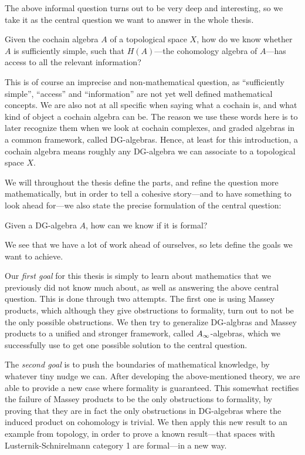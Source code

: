 The above informal question turns out to be very deep and interesting, so we take it as the central question we want to answer in the whole thesis. 

\begin{central}
Given the cochain algebra $A$ of a topological space $X$, how do we know whether $A$ is sufficiently simple, such that $H(A)$---the cohomology algebra of $A$---has access to all the relevant information?
\end{central}

This is of course an imprecise and non-mathematical question, as ``sufficiently simple'', ``access'' and ``information'' are not yet well defined mathematical concepts. We are also not at all specific when saying what a cochain is, and what kind of object a cochain algebra can be. The reason we use these words here is to later recognize them when we look at cochain complexes, and graded algebras in a common framework, called DG-algebras. Hence, at least for this introduction, a cochain algebra means roughly any DG-algebra we can associate to a topological space $X$. 

We will throughout the thesis define the parts, and refine the question more mathematically, but in order to tell a cohesive story---and to have something to look ahead for---we also state the precise formulation of the central question:

\begin{central}
Given a DG-algebra $A$, how can we know if it is formal?
\end{central}

We see that we have a lot of work ahead of ourselves, so lets define the goals we want to achieve. 

Our \textit{first goal} for this thesis is simply to learn about mathematics that we previously did not know much about, as well as answering the above central question. This is done through two attempts. The first one is using Massey products, which although they give obstructions to formality, turn out to not be the only possible obstructions. We then try to generalize DG-algbras and Massey products to a unified and stronger framework, called $A_{\infty}$-algebras, which we successfully use to get one possible solution to the central question. 

The \textit{second goal} is to push the boundaries of mathematical knowledge, by whatever tiny nudge we can. After developing the above-mentioned theory, we are able to provide a new case where formality is guaranteed. This somewhat rectifies the failure of Massey products to be the only obstructions to formality, by proving that they are in fact the only obstructions in DG-algebras where the induced product on cohomology is trivial. We then apply this new result to an example from topology, in order to prove a known result---that spaces with Lusternik-Schnirelmann category 1 are formal---in a new way. 

